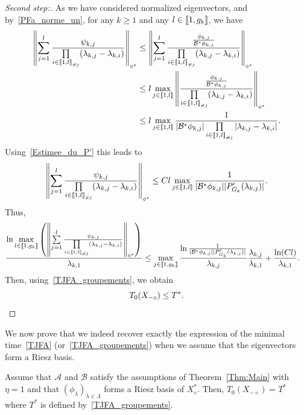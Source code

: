 \documentclass[AHL,Unicode,longabstracts]{cedram}
\newenvironment{step}[1]{\begin{proof}[#1]}{\let\qed\relax\end{proof}}
\newcommand{\llbracket}{\mathopen{[\mkern -2.7mu[}}
\newcommand{\rrbracket}{\mathclose{]\mkern -2.7mu]}}
\newcommand{\inter}[2]{\llbracket #1,#2 \rrbracket}
\newcommand{\interexclu}[3]{\llbracket #1,#2\rrbracket_{\neq #3}}
\newcommand\A{\mathcal{A}}
\newcommand\B{\mathcal{B}}
\newcommand\Bs{\mathcal{B}^*}
\newcommand{\Xalphas}{X_\diamond^*}
\newcommand{\Xmalpha}{X_{-\diamond}}
\newcommand{\normeXalphas}[1]{\left\| #1 \right\|_{\diamond^*}}
\newcommand{\n}{g}
\begin{document}
\begin{proofc}
\begin{step}{Second step:}
As we have considered normalized eigenvectors, and by~\eqref{PFa_norme_un}, for any $k \geq 1$ and any $l\in \inter{1}{\n_k}$, we have
\begin{align*}
\normeXalphas{ \sum\limits_{j=1}^l \frac{ \psi_{k,j} }{\prod\limits_{i\in \interexclu{1}{l}{j}} (\lambda_{k,j}-\lambda_{k,i})} } & \leq \normeXalphas{ \sum\limits_{j=1}^l \frac{ \frac{\phi_{k,j}}{\Bs \phi_{k,j}}}{\prod\limits_{i\in \interexclu{1}{l}{j}} (\lambda_{k,j}-\lambda_{k,i})} }
\\
&\leq l\max\limits_{j\in \inter{1}{l}} \normeXalphas{ \frac{ \frac{\phi_{k,j}}{\Bs \phi_{k,j}}}{\prod\limits_{i\in \interexclu{1}{l}{j}} (\lambda_{k,j}-\lambda_{k,i})} }
\\
&\leq l \max_{j\in \inter{1}{l}} \frac{1}{ | \Bs \phi_{k,j} | \prod\limits_{i\in \interexclu{1}{l}{j}}|\lambda_{k,j}-\lambda_{k,i} |}.
\end{align*}
Using~\eqref{Estimee_du_P'} this leads to
\begin{equation*}
\normeXalphas{ \sum\limits_{j=1}^l \frac{ \psi_{k,j} }{\prod\limits_{i\in \interexclu{1}{l}{j}} (\lambda_{k,j}-\lambda_{k,i})} }
\leq Cl \max_{j\in \inter{1}{l}} \frac{1}{ | \Bs \phi_{k,j} | | P_{G_k}'(\lambda_{k,j}) | }.
\end{equation*}
Thus,
\begin{align*}
\frac{\ln \max\limits_{l\in\inter{1}{\n_k}} \left(
\normeXalphas{ \sum\limits_{j=1}^l \frac{ \psi_{k,j} }{\prod\limits_{i\in \interexclu{1}{l}{j}} (\lambda_{k,j}-\lambda_{k,i})} }
\right) }{\lambda_{k,1}} &\leq \max_{j\in \inter{1}{\n_k}} \frac{\ln \frac{1}{ | \Bs \phi_{k,j} | | P_{G_k}'(\lambda_{k,j}) | }}{ \lambda _{k,j} } \frac{\lambda_{k,j}}{\lambda_{k,1} }+ \frac{\ln(C l)}{\lambda_{k,1}}.
\end{align*}
Then, using~\eqref{TJFA_groupements}, we obtain
\[
T_{0}(\Xmalpha)\leq T^*.\qedhere
\]
\end{step}\let\qed\relax
\end{proofc}


We now prove that we indeed recover exactly the expression of the minimal time~\eqref{TJFA} (or~\eqref{TJFA_groupements}) when we assume that the eigenvectors form a Riesz basis.

\begin{prop}\label{Prop:T_0>T*}
Assume that $\A$ and $\B$ satisfy the assumptions of Theorem~\ref{Thm:Main} with $\eta=1$ and that $(\phi_\lambda)_{\lambda\in \Lambda}$ forms a Riesz basis of $\Xalphas$. Then, $T_0(\Xmalpha)=T^*$ where $T^*$ is defined by~\eqref{TJFA_groupements}.
\end{prop}
\end{document}
